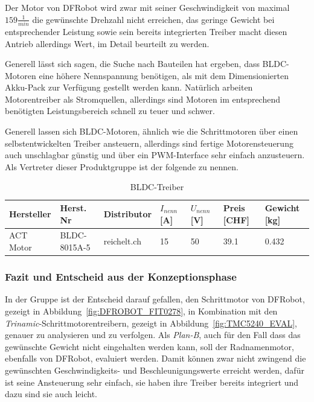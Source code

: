 \documentclass[main.tex]{subfiles} %
\begin{document}
Der Motor von DFRobot wird zwar mit seiner Geschwindigkeit von maximal $159
    \frac{1}{min}$ die gewünschte Drehzahl nicht erreichen, das geringe Gewicht bei
entsprechender Leistung sowie sein bereits integrierten Treiber macht diesen
Antrieb allerdings Wert, im Detail beurteilt zu werden.

Generell lässt sich sagen, die Suche nach Bauteilen hat ergeben, dass
BLDC-Motoren eine höhere Nennspannung benötigen, als mit dem Dimensionierten
Akku-Pack zur Verfügung gestellt werden kann. Natürlich arbeiten Motorentreiber
als Stromquellen, allerdings sind Motoren im entsprechend benötigten
Leistungsbereich schnell zu teuer und schwer.

Generell lassen sich BLDC-Motoren, ähnlich wie die Schrittmotoren über einen
selbstentwickelten Treiber ansteuern, allerdings sind fertige Motorensteuerung
auch unschlagbar günstig und über ein PWM-Interface sehr einfach anzusteuern.
Als Vertreter dieser Produktgruppe ist der folgende zu nennen.

\begin{table}[h]
    \centering
    \begin{tabular}{|p{2cm}|p{3cm}|p{2cm}|p{1cm}|p{1cm}|p{1cm}|p{1.5cm}|}
        \hline
        Hersteller & Herst. Nr    & Distributor & $I_{nenn} $ [A] & $U_{nenn}$ [V] & Preis [CHF] & Gewicht [kg] \\ \hline
        ACT Motor  & BLDC-8015A-5 & reichelt.ch & 15              & 50             & 39.1        & 0.432        \\ \hline
    \end{tabular}
    \caption{BLDC-Treiber}
\end{table}

\subsubsection*{Fazit und Entscheid aus der Konzeptionsphase}  %

In der Gruppe ist der Entscheid darauf gefallen, den Schrittmotor von DFRobot,
gezeigt in Abbildung~\ref{fig:DFROBOT_FIT0278}, in Kombination mit den
\textit{Trinamic}-Schrittmotorentreibern, gezeigt in
Abbildung~\ref{fig:TMC5240_EVAL}, genauer zu analysieren und zu verfolgen. Als
\textit{Plan-B}, auch für den Fall dass das gewünschte Gewicht nicht
eingehalten werden kann, soll der Radnamenmotor, ebenfalls von DFRobot,
evaluiert werden. Damit können zwar nicht zwingend die gewünschten
Geschwindigkeits- und Beschleunigungswerte erreicht werden, dafür ist seine
Ansteuerung sehr einfach, sie haben ihre Treiber bereits integriert und dazu
sind sie auch leicht.
\end{document}
